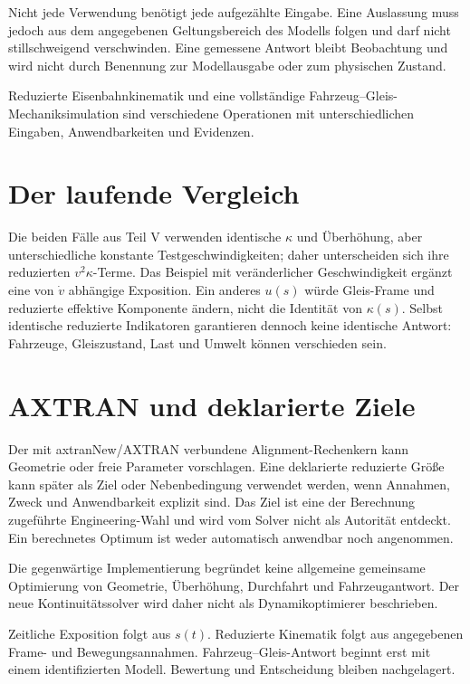 Nicht jede Verwendung benötigt jede aufgezählte Eingabe. Eine Auslassung muss
jedoch aus dem angegebenen Geltungsbereich des Modells folgen und darf nicht
stillschweigend verschwinden. Eine gemessene Antwort bleibt Beobachtung und
wird nicht durch Benennung zur Modellausgabe oder zum physischen Zustand.

\begin{principle}[Mechaniktrennungsprinzip]
\label{princ:mechanics-separation}
Reduzierte Eisenbahnkinematik und eine vollständige
Fahrzeug--Gleis-Mechaniksimulation sind verschiedene Operationen mit
unterschiedlichen Eingaben, Anwendbarkeiten und Evidenzen.
\end{principle}

\section{Der laufende Vergleich}

Die beiden Fälle aus Teil V verwenden identische \(\kappa\) und Überhöhung,
aber unterschiedliche konstante Testgeschwindigkeiten; daher unterscheiden
sich ihre reduzierten \(v^2\kappa\)-Terme. Das Beispiel mit veränderlicher
Geschwindigkeit ergänzt eine von \(\dot v\) abhängige Exposition. Ein anderes
\(u(s)\) würde Gleis-Frame und reduzierte effektive Komponente ändern, nicht
die Identität von \(\kappa(s)\). Selbst identische reduzierte Indikatoren
garantieren dennoch keine identische Antwort: Fahrzeuge, Gleiszustand, Last und
Umwelt können verschieden sein.

\section{AXTRAN und deklarierte Ziele}

Der mit axtranNew/AXTRAN verbundene Alignment-Rechenkern kann Geometrie oder
freie Parameter vorschlagen. Eine deklarierte reduzierte Größe kann später als
Ziel oder Nebenbedingung verwendet werden, wenn Annahmen, Zweck und
Anwendbarkeit explizit sind. Das Ziel ist eine der Berechnung zugeführte
Engineering-Wahl und wird vom Solver nicht als Autorität entdeckt. Ein
berechnetes Optimum ist weder automatisch anwendbar noch angenommen.

Die gegenwärtige Implementierung begründet keine allgemeine gemeinsame
Optimierung von Geometrie, Überhöhung, Durchfahrt und Fahrzeugantwort. Der neue
Kontinuitätssolver wird daher nicht als Dynamikoptimierer beschrieben.

\begin{summary}
Zeitliche Exposition folgt aus \(s(t)\). Reduzierte Kinematik folgt aus
angegebenen Frame- und Bewegungsannahmen. Fahrzeug--Gleis-Antwort beginnt erst
mit einem identifizierten Modell. Bewertung und Entscheidung bleiben
nachgelagert.
\end{summary}

